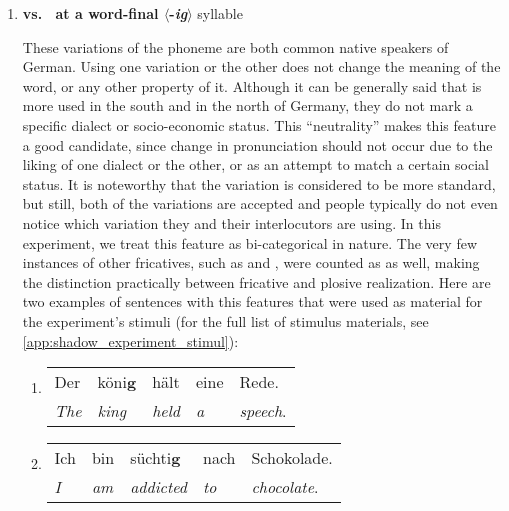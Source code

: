 \begin{enumerate}    
	\item \textbf{\textipa{[\c{c}]} vs.\ \textipa{[k]} at a word-final $\langle$-\textit{ig}$\rangle$} syllable
	
	These variations of the phoneme \textipa{[\c{c}]} are both common native speakers of German.
	Using one variation or the other does not change the meaning of the word, or any other property of it.
	Although it can be generally said that \textipa{[\c{c}]} is more used in the south and \textipa{[k]} in the north of Germany, they do not mark a specific dialect or socio-economic status.
	This \enquote{neutrality} makes this feature a good candidate, since change in pronunciation should not occur due to the liking of one dialect or the other, or as an attempt to match a certain social status.
	It is noteworthy that the \textipa{[\c{c}]} variation is considered to be more standard, but still, both of the variations are accepted and people typically do not even notice which variation they and their interlocutors are using.
	In this experiment, we treat this feature as bi-categorical in nature.
	The very few instances of other fricatives, such as \textipa{[S]} and \textipa{[J]}, were counted as \textipa{[\c{c}]} as well, making the distinction practically between fricative and plosive realization.
	Here are two examples of sentences with this features that were used as material for the experiment's stimuli (for the full list of stimulus materials, see \autoref{app:shadow_experiment_stimul}):
	
	\begin{enumerate}[label=\arabic{enumi}\alph*), ref=\arabic{enumi}\alph*.)]
		\item 
		\begin{tabulary}{\linewidth}{LLLLL}
			Der				& köni\textbf{\underline{g}} & hält				& 	eine	& Rede.\\
			\textit{The}	& \textit{king} 			 & \textit{held}	& \emph{a}  & \emph{speech}.\\
		\end{tabulary}
		\item
		\begin{tabulary}{\linewidth}{LLLLL}
			Ich 		& bin		  & süchti\textbf{\underline{g}} & nach 		& Schokolade.\\
			\textit{I}  & \textit{am} & \textit{addicted} 			 & \textit{to}  & \textit{chocolate}.\\
		\end{tabulary}
	\end{enumerate}
	

\end{enumerate}
